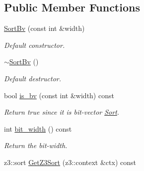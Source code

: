 \subsection*{Public Member Functions}
\begin{DoxyCompactItemize}
\item 
\mbox{\label{classilang_1_1_sort_bv_ad89f9d8bca535bb00d0ef69484f1f6da}} 
\mbox{\hyperlink{classilang_1_1_sort_bv_ad89f9d8bca535bb00d0ef69484f1f6da}{Sort\+Bv}} (const int \&width)
\begin{DoxyCompactList}\small\item\em Default constructor. \end{DoxyCompactList}\item 
\mbox{\label{classilang_1_1_sort_bv_a3c70c668fe7b110b344a031f8442e427}} 
\mbox{\hyperlink{classilang_1_1_sort_bv_a3c70c668fe7b110b344a031f8442e427}{$\sim$\+Sort\+Bv}} ()
\begin{DoxyCompactList}\small\item\em Default destructor. \end{DoxyCompactList}\item 
\mbox{\label{classilang_1_1_sort_bv_a9b1710bbb62faa53378e6c2687db4e2c}} 
bool \mbox{\hyperlink{classilang_1_1_sort_bv_a9b1710bbb62faa53378e6c2687db4e2c}{is\+\_\+bv}} (const int \&width) const
\begin{DoxyCompactList}\small\item\em Return true since it is bit-\/vector \mbox{\hyperlink{classilang_1_1_sort}{Sort}}. \end{DoxyCompactList}\item 
\mbox{\label{classilang_1_1_sort_bv_a5696320a1af850948ebc70d658d515e4}} 
int \mbox{\hyperlink{classilang_1_1_sort_bv_a5696320a1af850948ebc70d658d515e4}{bit\+\_\+width}} () const
\begin{DoxyCompactList}\small\item\em Return the bit-\/width. \end{DoxyCompactList}\item 
\mbox{\label{classilang_1_1_sort_bv_aeb0bf2bb2e0be7cbf61eb09dd7627158}} 
z3\+::sort \mbox{\hyperlink{classilang_1_1_sort_bv_aeb0bf2bb2e0be7cbf61eb09dd7627158}{Get\+Z3\+Sort}} (z3\+::context \&ctx) const

\end{DoxyCompactItemize}
